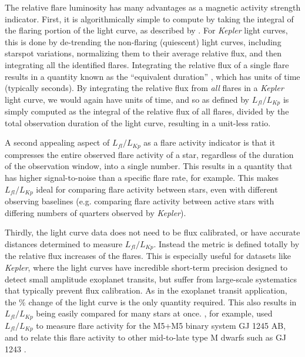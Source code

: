 \documentclass[preprint2]{aastex62}
\newcommand{\Kepler}{\textsl{Kepler}\xspace}
\begin{document}
The relative flare luminosity has many advantages as a magnetic activity strength indicator. First, it is algorithmically simple to compute by taking the integral of the flaring portion of the light curve, as described by \citet{kunkel1975}. For \Kepler light curves, this is done by de-trending the non-flaring (quiescent) light curves, including starspot variations, normalizing them to their average relative flux, and then integrating all the identified flares. Integrating the relative flux of a single flare results in a quantity known as the ``equivalent duration'' \citep[e.g. see][]{huntwalker2012}, which has units of time (typically seconds). By integrating the relative flux from {\it all} flares in a \Kepler light curve, we would again have units of time, and so as defined by \citet{lurie2015} $L_{fl}/L_{Kp}$ is simply computed as the integral of the relative flux of all flares, divided by the total observation duration of the light curve, resulting in a unit-less ratio.



A second appealing aspect of $L_{fl}/L_{Kp}$ as a flare activity indicator is that it compresses the entire observed flare activity of a star, regardless of the duration of the observation window, into a single number. This results in a quantity that has higher signal-to-noise than a specific flare rate, for example. This makes $L_{fl}/L_{Kp}$ ideal for comparing flare activity between stars, even with different observing baselines (e.g. comparing flare activity between active stars with differing numbers of quarters observed by \Kepler).

Thirdly, the light curve data does not need to be flux calibrated, or have accurate distances determined to measure $L_{fl}/L_{Kp}$. Instead the metric is defined totally by the relative flux increases of the flares. This is especially useful for datasets like \Kepler, where the light curves have incredible short-term precision designed to detect small amplitude exoplanet transits, but suffer from large-scale systematics that typically prevent flux calibration. As in the exoplanet transit application, the \% change of the light curve is the only quantity required. This also results in $L_{fl}/L_{Kp}$ being easily compared for many stars at once. \citet{lurie2015}, for example, used $L_{fl}/L_{Kp}$ to measure flare activity for the M5+M5 binary system GJ 1245 AB, and to relate this flare activity to other mid-to-late type M dwarfs such as GJ 1243 \citep{davenport2014b}. 
\end{document}
